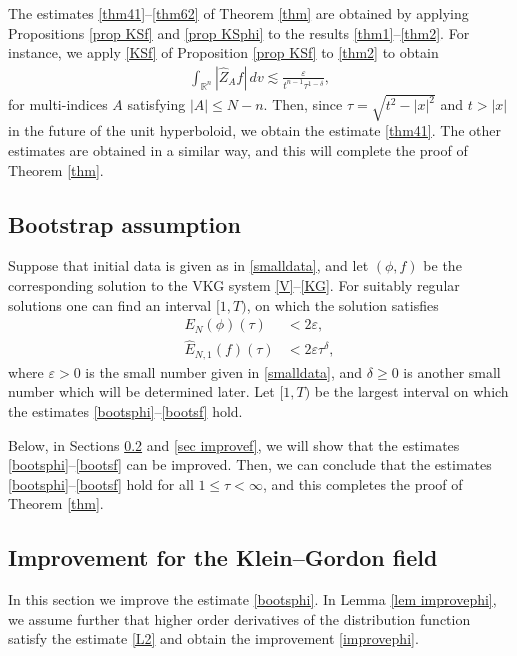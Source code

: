 \documentclass{article}
\newcommand{\bbr}{{\mathbb R}}
\begin{document}
The estimates \eqref{thm41}--\eqref{thm62} of Theorem \ref{thm} are obtained by applying Propositions \ref{prop KSf} and \ref{prop KSphi} to the results \eqref{thm1}--\eqref{thm2}. For instance, we apply \eqref{KSf} of Proposition \ref{prop KSf} to \eqref{thm2} to obtain
\begin{align*}
\int_{ \bbr^n } | \hat{ Z }_A f | \, d v \lesssim \frac{ \varepsilon }{ t^{ n - 1 } \tau^{ 1 - \delta } } ,
\end{align*}
for multi-indices $ A $ satisfying $ | A | \leq N - n $. Then, since $ \tau = \sqrt{ t^2 - | x |^2 } $ and $ t > | x | $ in the future of the unit hyperboloid, we obtain the estimate \eqref{thm41}. The other estimates are obtained in a similar way, and this will complete the proof of Theorem \ref{thm}.


%
\subsection{Bootstrap assumption} \label{sec bootsassumption}
Suppose that initial data is given as in \eqref{smalldata}, and let $ ( \phi , f ) $ be the corresponding solution to the VKG system \eqref{V}--\eqref{KG}. For suitably regular solutions one can find an interval $ [ 1 , T ) $, on which the solution satisfies
\begin{align}
E_N ( \phi ) ( \tau ) & < 2 \varepsilon , \label{bootsphi} \\
\hat{ E }_{ N , 1 } ( f ) ( \tau ) & < 2 \varepsilon \tau^\delta , \label{bootsf}
\end{align}
where $ \varepsilon > 0 $ is the small number given in \eqref{smalldata}, and $ \delta \geq 0 $ is another small number which will be determined later. Let $ [ 1 , T ) $ be the largest interval on which the estimates \eqref{bootsphi}--\eqref{bootsf} hold.

Below, in Sections \ref{sec improvephi} and \ref{sec improvef}, we will show that the estimates \eqref{bootsphi}--\eqref{bootsf} can be improved. Then, we can conclude that the estimates \eqref{bootsphi}--\eqref{bootsf} hold for all $ 1 \leq \tau < \infty $, and this completes the proof of Theorem \ref{thm}.



%
\subsection{Improvement for the Klein--Gordon field} \label{sec improvephi}
In this section we improve the estimate \eqref{bootsphi}. In Lemma \ref{lem improvephi}, we assume further that higher order derivatives of the distribution function satisfy the estimate \eqref{L2} and obtain the improvement \eqref{improvephi}.
\end{document}
